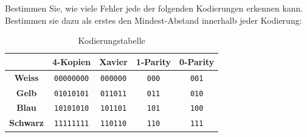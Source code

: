 \begin{myexercise}\label{ex:fehler-kodierungen}
    Bestimmen Sie, wie viele Fehler jede der folgenden Kodierungen erkennen kann. Bestimmen sie dazu als erstes den Mindest-Abstand innerhalb jeder Kodierung:
    \begin{table}[H]
        \centering
        \begin{tabular}{c|c|c|c|c}
                             & \textbf{4-Kopien} & \textbf{Xavier} & \textbf{1-Parity} & \textbf{0-Parity} \\
            \midrule\midrule
            \textbf{Weiss}   & \texttt{00000000} & \texttt{000000} & \texttt{000}      & \texttt{001}      \\
            \midrule
            \textbf{Gelb}    & \texttt{01010101} & \texttt{011011} & \texttt{011}      & \texttt{010}      \\
            \midrule
            \textbf{Blau}    & \texttt{10101010} & \texttt{101101} & \texttt{101}      & \texttt{100}      \\
            \midrule
            \textbf{Schwarz} & \texttt{11111111} & \texttt{110110} & \texttt{110}      & \texttt{111}      \\
        \end{tabular}
        \caption{Kodierungstabelle}
        \label{tab:kodierung}
    \end{table}
\end{myexercise}
